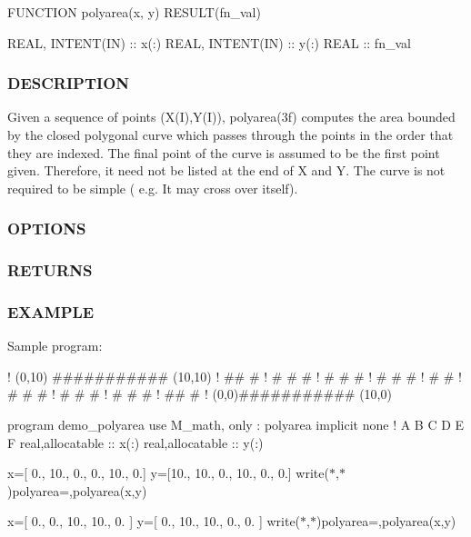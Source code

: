 \begin{DoxyVerb}FUNCTION polyarea(x, y) RESULT(fn_val)

   REAL, INTENT(IN)     :: x(:)
   REAL, INTENT(IN)     :: y(:)
   REAL                 :: fn_val
\end{DoxyVerb}


\subsubsection*{D\+E\+S\+C\+R\+I\+P\+T\+I\+ON}

Given a sequence of points (X(\+I),Y(\+I)), polyarea(3f) computes the area bounded by the closed polygonal curve which passes through the points in the order that they are indexed. The final point of the curve is assumed to be the first point given. Therefore, it need not be listed at the end of X and Y. The curve is not required to be simple ( e.\+g. It may cross over itself).

\subsubsection*{O\+P\+T\+I\+O\+NS}

\subsubsection*{R\+E\+T\+U\+R\+NS}

\subsubsection*{E\+X\+A\+M\+P\+LE}

Sample program\+:

! (0,10) \#\#\#\#\#\#\#\#\#\#\# (10,10) ! \#\# \# ! \# \# \# ! \# \# \# ! \# \# \# ! \# \# ! \# \# \# ! \# \# \# ! \# \# \# ! \#\# \# ! (0,0)\#\#\#\#\#\#\#\#\#\#\# (10,0)

program demo\+\_\+polyarea use M\+\_\+math, only \+: polyarea implicit none ! A B C D E F real,allocatable \+:\+: x(\+:) real,allocatable \+:\+: y(\+:)

x=\mbox{[} 0., 10., 0., 0., 10., 0.\mbox{]} y=\mbox{[}10., 10., 0., 10., 0., 0.\mbox{]} write($\ast$,$\ast$)\textquotesingle{}polyarea=\textquotesingle{},polyarea(x,y)

x=\mbox{[} 0., 0., 10., 10., 0. \mbox{]} y=\mbox{[} 0., 10., 10., 0., 0. \mbox{]} write($\ast$,$\ast$)\textquotesingle{}polyarea=\textquotesingle{},polyarea(x,y)

